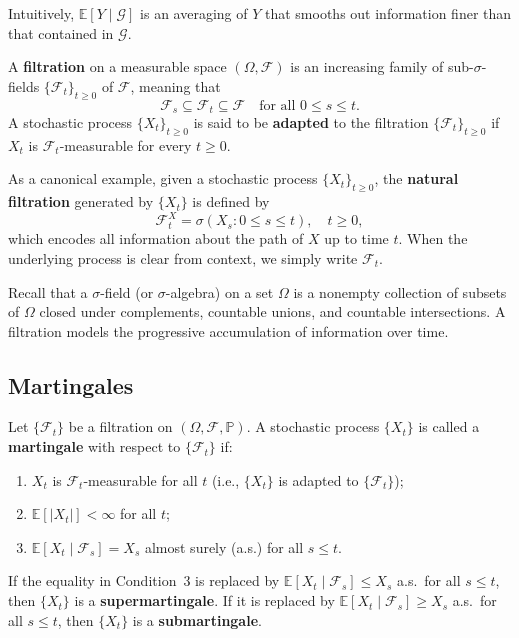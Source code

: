 Intuitively, $\mathbb{E}[Y \mid \mathcal{G}]$ is an averaging of $Y$ that smooths out information finer than that contained in $\mathcal{G}$.

\begin{definition}
\label{def:filtration}
A \textbf{filtration} on a measurable space $(\Omega, \mathcal{F})$ is an increasing family of sub-$\sigma$-fields $\{\mathcal{F}_t\}_{t \ge 0}$ of $\mathcal{F}$, meaning that
\[
\mathcal{F}_s \subseteq \mathcal{F}_t \subseteq \mathcal{F} \quad \text{for all } 0 \le s \le t.
\]
A stochastic process $\{X_t\}_{t \ge 0}$ is said to be \textbf{adapted} to the filtration $\{\mathcal{F}_t\}_{t \ge 0}$ if $X_t$ is $\mathcal{F}_t$-measurable for every $t \ge 0$.

As a canonical example, given a stochastic process $\{X_t\}_{t \ge 0}$, the \textbf{natural filtration} generated by $\{X_t\}$ is defined by
\[
\mathcal{F}_t^X = \sigma(X_s : 0 \le s \le t), \quad t \ge 0,
\]
which encodes all information about the path of $X$ up to time $t$. When the underlying process is clear from context, we simply write $\mathcal{F}_t$.
\end{definition}

\begin{remark}
Recall that a $\sigma$-field (or $\sigma$-algebra) on a set $\Omega$ is a nonempty collection of subsets of $\Omega$ closed under complements, countable unions, and countable intersections. A filtration models the progressive accumulation of information over time.
\end{remark}

\subsection*{Martingales}

\begin{definition}
\label{def:martingale}
Let $\{\mathcal{F}_t\}$ be a filtration on $(\Omega, \mathcal{F}, \mathbb{P})$. A stochastic process $\{X_t\}$ is called a \textbf{martingale} with respect to $\{\mathcal{F}_t\}$ if:
\begin{enumerate}
    \item $X_t$ is $\mathcal{F}_t$-measurable for all $t$ (i.e., $\{X_t\}$ is adapted to $\{\mathcal{F}_t\}$);
    \item $\mathbb{E}[|X_t|] < \infty$ for all $t$;
    \item $\mathbb{E}[X_t \mid \mathcal{F}_s] = X_s$ almost surely (a.s.) for all $s \le t$.
\end{enumerate}
If the equality in Condition~3 is replaced by $\mathbb{E}[X_t \mid \mathcal{F}_s] \le X_s$ a.s.\ for all $s \le t$, then $\{X_t\}$ is a \textbf{supermartingale}. If it is replaced by $\mathbb{E}[X_t \mid \mathcal{F}_s] \ge X_s$ a.s.\ for all $s \le t$, then $\{X_t\}$ is a \textbf{submartingale}.
\end{definition}

